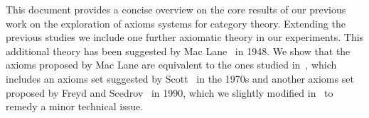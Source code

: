 %
\begin{isabellebody}%
%
%
\isadelimtheory
%
\endisadelimtheory
%
\isatagtheory
%
\endisatagtheory
{\isafoldtheory}%
%
\isadelimtheory
%
\endisadelimtheory
%
\isamarkuptrue%
%
\begin{isamarkuptext}%
This document provides a concise overview on the core results of our previous
       work \cite{C67,R58,C57} on the exploration of axioms systems for category theory.
       Extending the previous studies we
       include one further axiomatic theory in our experiments. This additional 
       theory has been suggested by Mac Lane~\cite{MacLane48} in
       1948. We show that the axioms proposed by Mac Lane are equivalent to the ones studied
       in~\cite{R58}, which includes an axioms set suggested by Scott~\cite{Scott79} 
       in the 1970s and another axioms set proposed by Freyd and Scedrov~\cite{FreydScedrov90} in 1990, 
       which we slightly modified in~\cite{R58} to remedy a minor technical issue.   
 

\end{isamarkuptext}
\end{isabellebody}
